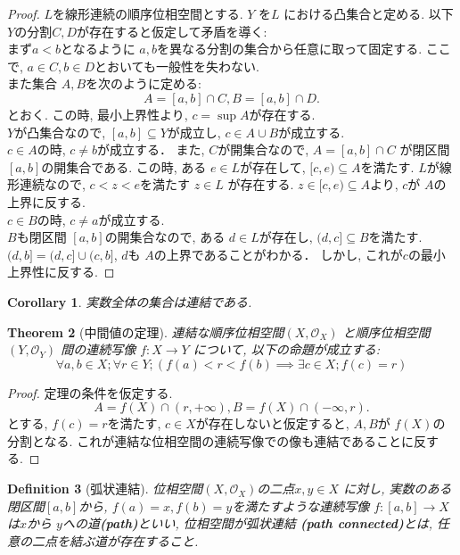 \documentclass[lualatex]{ltjsbook}
\newtheorem{theorem}{Theorem}[chapter]
\newtheorem{corollary}[theorem]{Corollary}
\newtheorem{definition}[theorem]{Definition}
\theoremstyle{remark}
\theoremstyle{plain}
\begin{document}
\begin{proof}
	$L$を線形連続の順序位相空間とする. 
	$Y$ を$L$ における凸集合と定める. 
	以下$Y$の分割$C, D$が存在すると仮定して矛盾を導く:\\ 
	まず$a<b$となるように $a, b$を異なる分割の集合から任意に取って固定する. 
	ここで,  $a \in C,  b \in D$とおいても一般性を失わない.\\
	また集合 $A, B$を次のように定める:
	 \[
		 A=[a, b] \cap C,  B= [a, b] \cap D
	.\] 
	とおく. この時,  最小上界性より,  $c=\sup A$が存在する.\\
	$Y$が凸集合なので,   $[a, b] \subseteq Y$が成立し,  $ c \in A \cup B$が成立する.\\
	$c\in A$の時,   $c \neq b$が成立する．
	また,  $C$が開集合なので,  $A=[a, b] \cap C$ が閉区間$[a, b]$の開集合である. 
	この時,  ある $e \in L$が存在して,   $[c, e) \subseteq A$を満たす.
	$L$が線形連続なので,   $c<z<e$を満たす $z \in L$ が存在する. 
	$z \in [c, e) \subseteq A$より,  $c$が $A$の上界に反する.\\
	 $c \in B$の時,   $c \neq a$が成立する. \\
	 $B$も閉区間 $[a, b]$の開集合なので,  ある $d \in L$が存在し,   $(d, c] \subseteq B$を満たす.
	 $(d, b] = (d, c] \cup (c , b]$,  $d$も $A$の上界であることがわかる．
	 しかし,  これが$c$の最小上界性に反する.
\end{proof}

\begin{corollary}
	実数全体の集合は連結である.
\end{corollary}

\begin{theorem}[中間値の定理]
	連結な順序位相空間$\left( X , \mathcal{O}_X \right) $ と順序位相空間$ \left( Y,  \mathcal{O}_Y \right) $ 間の連続写像
	$f: X \to Y$ について,  以下の命題が成立する: 
	$$
	\forall a, b \in X; \forall r \in Y; \left( f(a)<r< f(b) \implies \exists c \in X ;f(c) =r \right)
	$$
\end{theorem}

\begin{proof}
	定理の条件を仮定する. 
	\[
	A=f(X) \cap (r,  + \infty),  B= f(X) \cap (- \infty,  r)
	.\]
	とする,  $f(c) =r$を満たす,   $c \in X$が存在しないと仮定すると,   $A, B$が $f(X)$の分割となる. 
	これが連結な位相空間の連続写像での像も連結であることに反する.
\end{proof}

\begin{definition}[弧状連結]
	位相空間$ \left( X ,  \mathcal{O}_X \right) $の二点$x, y \in X$ に対し,  
	実数のある閉区間$[a, b]$から,   $f(a) =x, f(b) = y$を満たすような連続写像 
	$f: [a, b] \to X$は$x$から $y$への道\textbf{(path)}といい,  
	位相空間が弧状連結 \textbf{(path connected)}とは,  任意の二点を結ぶ道が存在すること.
\end{definition}
\end{document}
